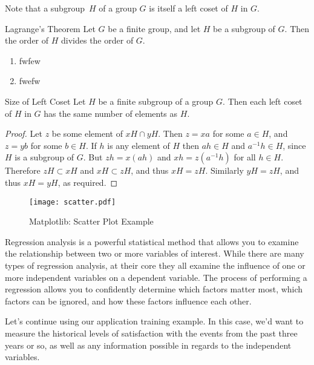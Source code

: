 \documentclass[noanswer,fancy,blue,11pt]{elegantbook}
\begin{document}
\begin{note}
Note that a subgroup~$H$ of a group $G$ is itself a left coset of $H$ in $G$.
\end{note}

\lipsum[2]

\begin{theorem}{Lagrange's Theorem}{}
Let $G$ be a finite group, and let $H$ be a subgroup of $G$.  Then the order of $H$ divides the order of $G$.
\begin{enumerate}
\item fwfew
\item fwefw
\end{enumerate}
\end{theorem}

\lipsum[3]

   
\begin{proposition}{Size of Left Coset}{}
Let $H$ be a finite subgroup of a group $G$.  Then each left coset of $H$ in $G$ has the same number of elements as $H$.
\end{proposition}

\begin{proof}
Let $z$ be some element of $xH \cap yH$.  Then $z = xa$ for some $a \in H$, and $z = yb$ for some $b \in H$. If $h$ is any element of $H$ then $ah \in H$ and $a^{-1}h \in H$, since $H$ is a subgroup of $G$. But $zh = x(ah)$ and $xh = z(a^{-1}h)$ for all $h \in H$. Therefore $zH \subset xH$ and $xH \subset zH$, and thus $xH = zH$.  Similarly $yH = zH$, and thus $xH = yH$, as required.
\end{proof}

\begin{figure}[htbp]
	\centering
	\texttt{[image: scatter.pdf]}
	\caption{Matplotlib: Scatter Plot Example\label{fig:scatter}}
\end{figure}

Regression analysis is a powerful statistical method that allows you to examine the relationship between two or more variables of interest. While there are many types of regression analysis, at their core they all examine the influence of one or more independent variables on a dependent variable. The process of performing a regression allows you to confidently determine which factors matter most, which factors can be ignored, and how these factors influence each other.

Let's continue using our application training example. In this case, we'd want to measure the historical levels of satisfaction with the events from the past three years or so, as well as any information possible in regards to the independent variables. 
\end{document}
